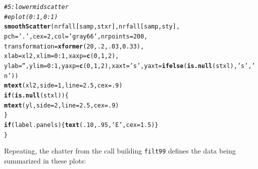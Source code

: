 \documentclass{article}\usepackage[]{graphicx}\usepackage[]{color}
\makeatletter
\newcommand{\hlnum}[1]{\textcolor[rgb]{0.686,0.059,0.569}{#1}}%
\newcommand{\hlstr}[1]{\textcolor[rgb]{0.192,0.494,0.8}{#1}}%
\newcommand{\hlcom}[1]{\textcolor[rgb]{0.678,0.584,0.686}{\textit{#1}}}%
\newcommand{\hlopt}[1]{\textcolor[rgb]{0,0,0}{#1}}%
\newcommand{\hlstd}[1]{\textcolor[rgb]{0.345,0.345,0.345}{#1}}%
\newcommand{\hlkwa}[1]{\textcolor[rgb]{0.161,0.373,0.58}{\textbf{#1}}}%
\newcommand{\hlkwc}[1]{\textcolor[rgb]{0.333,0.667,0.333}{#1}}%
\newcommand{\hlkwd}[1]{\textcolor[rgb]{0.737,0.353,0.396}{\textbf{#1}}}%
\newenvironment{kframe}{%
 \def\at@end@of@kframe{}%
 \ifinner\ifhmode%
  \def\at@end@of@kframe{\end{minipage}}%
  \begin{minipage}{\columnwidth}%
 \fi\fi%
 \def\FrameCommand##1{\hskip\@totalleftmargin \hskip-\fboxsep
 \colorbox{shadecolor}{##1}\hskip-\fboxsep
     \hskip-\linewidth \hskip-\@totalleftmargin \hskip\columnwidth}%
 \MakeFramed {\advance\hsize-\width
   \@totalleftmargin\z@ \linewidth\hsize
   \@setminipage}}%
 {\par\unskip\endMakeFramed%
 \at@end@of@kframe}
\newenvironment{knitrout}{}{} %
\makeatother
\begin{document}
\begin{knitrout}
\begin{kframe}
\begin{alltt}
  \hlcom{# 5: lower mid scatter}
  \hlcom{#eplot(0:1,0:1)}
  \hlkwd{smoothScatter}\hlstd{(nrfall[samp,stxr], nrfall[samp,sty],}
                \hlkwc{pch}\hlstd{=}\hlstr{'.'}\hlstd{,} \hlkwc{cex}\hlstd{=}\hlnum{2}\hlstd{,} \hlkwc{col}\hlstd{=}\hlstr{'gray66'}\hlstd{,} \hlkwc{nrpoints}\hlstd{=}\hlnum{200}\hlstd{,}
                \hlkwc{transformation}\hlstd{=}\hlkwd{xformer}\hlstd{(}\hlnum{20}\hlstd{,}\hlnum{.2}\hlstd{,}\hlnum{.03}\hlstd{,}\hlnum{0.33}\hlstd{),}
                \hlkwc{xlab}\hlstd{=xl2,} \hlkwc{xlim}\hlstd{=}\hlnum{0}\hlopt{:}\hlnum{1}\hlstd{,} \hlkwc{xaxp}\hlstd{=}\hlkwd{c}\hlstd{(}\hlnum{0}\hlstd{,}\hlnum{1}\hlstd{,}\hlnum{2}\hlstd{),}
                \hlkwc{ylab}\hlstd{=}\hlstr{''}\hlstd{,}  \hlkwc{ylim}\hlstd{=}\hlnum{0}\hlopt{:}\hlnum{1}\hlstd{,} \hlkwc{yaxp}\hlstd{=}\hlkwd{c}\hlstd{(}\hlnum{0}\hlstd{,}\hlnum{1}\hlstd{,}\hlnum{2}\hlstd{),}\hlkwc{xaxt}\hlstd{=}\hlstr{'s'}\hlstd{,}\hlkwc{yaxt}\hlstd{=}\hlkwd{ifelse}\hlstd{(}\hlkwd{is.null}\hlstd{(stxl),}\hlstr{'s'}\hlstd{,}\hlstr{'n'}\hlstd{))}
  \hlkwd{mtext}\hlstd{(xl2,} \hlkwc{side}\hlstd{=}\hlnum{1}\hlstd{,} \hlkwc{line}\hlstd{=}\hlnum{2.5}\hlstd{,} \hlkwc{cex}\hlstd{=}\hlnum{.9}\hlstd{)}
  \hlkwa{if}\hlstd{(}\hlkwd{is.null}\hlstd{(stxl))\{}
    \hlkwd{mtext}\hlstd{(yl,} \hlkwc{side}\hlstd{=}\hlnum{2}\hlstd{,} \hlkwc{line}\hlstd{=}\hlnum{2.5}\hlstd{,} \hlkwc{cex}\hlstd{=}\hlnum{.9}\hlstd{)}
  \hlstd{\}}
  \hlkwa{if}\hlstd{(label.panels)\{}\hlkwd{text}\hlstd{(}\hlnum{.10}\hlstd{,} \hlnum{.95}\hlstd{,} \hlstr{'E'}\hlstd{,} \hlkwc{cex}\hlstd{=}\hlnum{1.5}\hlstd{)\}}
\hlstd{\}}
\end{alltt}
\end{kframe}
\end{knitrout}

Repeating, the chatter from the call building \texttt{filt99} defines the data being summarized in these plots:
\end{document}
